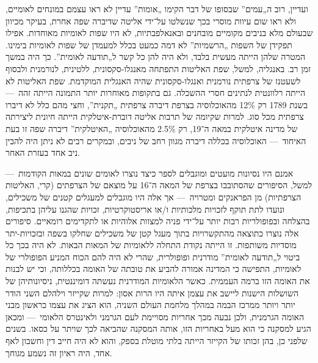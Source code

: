 ועדיין, רוב ה„עמים” שבסופו של דבר הקימו „אומות” עדיין לא ראו עצמם במונחים לאומיים, ולא ראו שום עיוות מוסרי בכך שנשלטו על־ידי אליטה שדיברה שפה אחרת, בעיקר מכיוון שבעולם מלא בניבים מקומיים מובחנים ובאנאלפבתיות, לא היו שפות לאומיות מאוחדות. אפילו תפקידן של השפות „הרשמיות” לא דמה כמעט בכלל למעמדן של שפות לאומיות בימינו. המטרה שלהן הייתה מעשית בלבד, ולא היה להן כל קשר ל„תודעה לאומית”. כך היה במשך זמן רב. באנגליה, למשל, שפת האליטות התפתחה מאנגלו-סקסונית, ללטינית, לנורמנית ולבסוף לשעטנז של צרפתית נורמנית ואנגלו-סקסונית שהיה האנגלית המוקדמת. שפת האליטות לא הייתה רלוונטית לנתינים חסרי ההשכלה. גם בתקופות מאוחרות יותר התמונה הייתה זהה~— בשנת 1789 רק 12\% מהאוכלוסיה בצרפת דיברה צרפתית „תקנית”, וחצי מהם כלל לא דיברו צרפתית מכל סוג. למרות שקיומה של תרבות אליטה דוברת-איטלקית הייתה חיונית ליצירתה של מדינה איטלקית במאה ה־19, רק 2.5\% מהאוכלוסיה „האיטלקית” דיברה שפה זו בעת האיחוד~— האוכלוסיה בכללה דיברה מגוון רחב של ניבים, ובמקרים רבים לא ניתן היה להבין ניב אחד בעזרת האחר.

אמנם היו נסיונות מועטים ומוגבלים לספר כיצד נוצרו לאומים שונים במאות הקודמות~— למשל, הסיפורים שהסתובבו בצרפת של המאה ה־16 על מוצאם של הצרפתים (קרי, האליטות הצרפתיות) מן הפראנקים ומטרויה~— אך אלה היו מוגבלים למעגלים קטנים של משכילים, ונועדו לתת תוקף לזכויות מלכותיות ו/או אריסטוקרטיות, זכויות שהגנו עליהן בתכיפות, בהצלחה ובפופולריות רבות יותר על־ידי פניה למצוות אלוהיות או לתקדימים רומאיים. סיפורים אלה נוצרו כתוצאה מהתקשרויות בתוך מעגל קטן של משכילים שחלקו בשפה ובזכויות-יתר מוסדיות משותפות. זו הייתה נקודת התחלה ללאומיות של המאות הבאות. לא היה בכך כל ביטוי ל„תודעה לאומית” מודרנית ופופולרית, שהרי לא היה להם הכוח המניע הפופולרי של לאומיות, התפישה כי המדינה אמורה להביע את טובתה של האומה בכללותה, וכי יש לבנות את האומה הזו ברמה העממית. כאשר הלאומיות המודרנית נעשתה דומיננטית, ניסיונותיהן של השושלות הישנות ליישב את עצמן איתה היו הרות אסון: למרות שקייזר וילהלם השני הודר יותר ויותר ממרכז הבמה במהלך מלחמת העולם השניה, הוא הציג את עצמו כראשון מבני האומה הגרמנית, ולכן נבעה מכך אחריות מסויימת לעם הגרמני ולאינטרס הלאומי~— ומכאן הגיע למסקנה כי הוא מעל באחריות הזו, אותה המסקנה שהביאה לכך שויתר על כסאו. בשנים שלפני כן, בהן זכותו של הקייזר הייתה בלתי מוטלת בספק, והוא לא היה חייב דין וחשבון לאף אחד, היה ראיון זה נשמע מגוחך.

